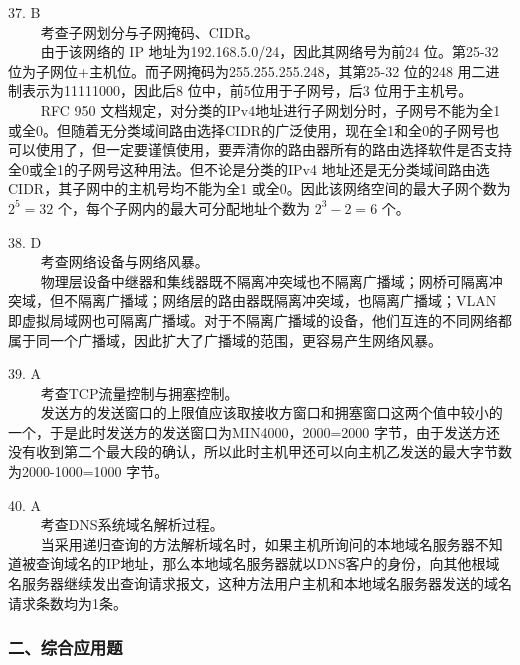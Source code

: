 37. B \\
$\qquad$ 考查子网划分与子网掩码、CIDR。\\
$\qquad$ 由于该网络的 IP 地址为192.168.5.0/24，因此其网络号为前24 位。第25-32 位为子网位+主机位。而子网掩码为255.255.255.248，其第25-32 位的248 用二进制表示为11111000，因此后8 位中，前5位用于子网号，后3 位用于主机号。 \\
$\qquad$ RFC 950 文档规定，对分类的IPv4地址进行子网划分时，子网号不能为全1或全0。但随着无分类域间路由选择CIDR的广泛使用，现在全1和全0的子网号也可以使用了，但一定要谨慎使用，要弄清你的路由器所有的路由选择软件是否支持全0或全1的子网号这种用法。但不论是分类的IPv4 地址还是无分类域间路由选CIDR，其子网中的主机号均不能为全1 或全0。因此该网络空间的最大子网个数为 $2^5=32$ 个，每个子网内的最大可分配地址个数为 $2^3-2=6$ 个。

38. D \\
$\qquad$ 考查网络设备与网络风暴。 \\
$\qquad$ 物理层设备中继器和集线器既不隔离冲突域也不隔离广播域；网桥可隔离冲突域，但不隔离广播域；网络层的路由器既隔离冲突域，也隔离广播域；VLAN 即虚拟局域网也可隔离广播域。对于不隔离广播域的设备，他们互连的不同网络都属于同一个广播域，因此扩大了广播域的范围，更容易产生网络风暴。

39. A \\
$\qquad$ 考查TCP流量控制与拥塞控制。\\
$\qquad$ 发送方的发送窗口的上限值应该取接收方窗口和拥塞窗口这两个值中较小的一个，于是此时发送方的发送窗口为MIN{4000，2000}=2000 字节，由于发送方还没有收到第二个最大段的确认，所以此时主机甲还可以向主机乙发送的最大字节数为2000-1000=1000 字节。

40. A \\
$\qquad$ 考查DNS系统域名解析过程。\\
$\qquad$ 当采用递归查询的方法解析域名时，如果主机所询问的本地域名服务器不知道被查询域名的IP地址，那么本地域名服务器就以DNS客户的身份，向其他根域名服务器继续发出查询请求报文，这种方法用户主机和本地域名服务器发送的域名请求条数均为1条。

\subsubsection{二、综合应用题}

